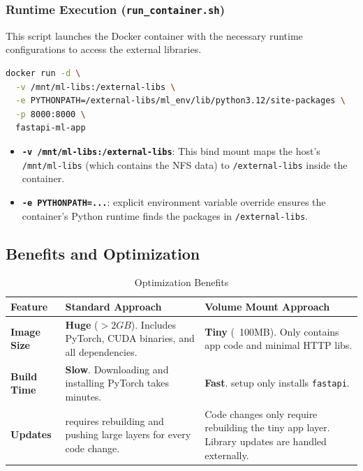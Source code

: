 \documentclass[11pt,a4paper]{article}
\begin{document}
\subsubsection{Runtime Execution (\texttt{run\_container.sh})}
This script launches the Docker container with the necessary runtime configurations to access the external libraries.

\begin{lstlisting}[language=Bash, caption={Container Execution Command}]
docker run -d \
  -v /mnt/ml-libs:/external-libs \
  -e PYTHONPATH=/external-libs/ml_env/lib/python3.12/site-packages \
  -p 8000:8000 \
  fastapi-ml-app
\end{lstlisting}

\begin{itemize}
    \item \textbf{\texttt{-v /mnt/ml-libs:/external-libs}}: This bind mount maps the host's \texttt{/mnt/ml-libs} (which contains the NFS data) to \texttt{/external-libs} inside the container.
    \item \textbf{\texttt{-e PYTHONPATH=...}}: explicit environment variable override ensures the container's Python runtime finds the packages in \texttt{/external-libs}.
\end{itemize}

\subsection{Benefits and Optimization}

\begin{table}[h!]
\centering
\caption{Optimization Benefits} 
\label{tab:docker_optimization}
\begin{tabular}{|l|p{6cm}|p{6cm}|}
\hline
\textbf{Feature} & \textbf{Standard Approach} & \textbf{Volume Mount Approach} \\ \hline
\textbf{Image Size} & \textbf{Huge} ($>2GB$). Includes PyTorch, CUDA binaries, and all dependencies. & \textbf{Tiny} (~100MB). Only contains app code and minimal HTTP libs. \\ \hline
\textbf{Build Time} & \textbf{Slow}. Downloading and installing PyTorch takes minutes. & \textbf{Fast}. setup only installs \texttt{fastapi}. \\ \hline
\textbf{Updates} & requires rebuilding and pushing large layers for every code change. & Code changes only require rebuilding the tiny app layer. Library updates are handled externally. \\ \hline
\end{tabular}
\end{table}
\end{document}
